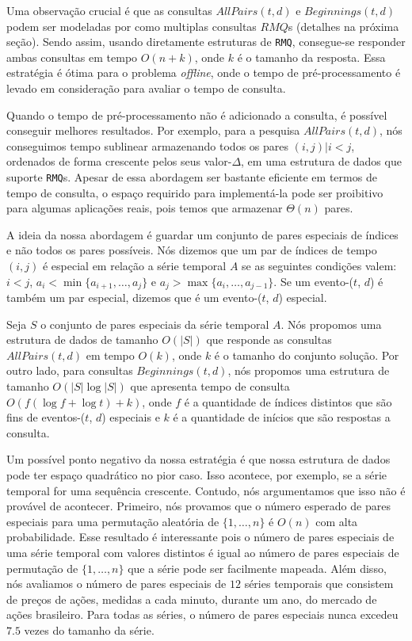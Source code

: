 \documentclass[12pt]{article}
\begin{document}
Uma observação crucial é que as consultas $AllPairs(t, d)$ e $Beginnings(t,d)$ podem
ser modeladas por como multiplas consultas $RMQ$s (detalhes na próxima seção). Sendo assim,
usando diretamente estruturas de \verb|RMQ|, consegue-se responder ambas consultas
em tempo $O(n + k)$, onde $k$ é o tamanho da resposta. Essa estratégia é ótima para
o problema \textit{offline}, onde o tempo de pré-processamento é levado em consideração
para avaliar o tempo de consulta.

Quando o tempo de pré-processamento não é adicionado a consulta, é possível conseguir
melhores resultados. Por exemplo, para a pesquisa $AllPairs(t,d)$, nós conseguimos
tempo sublinear armazenando todos os pares ${(i,j)| i < j}$, ordenados de forma crescente
pelos seus valor-$\Delta$, em uma estrutura de dados que suporte \verb|RMQ|s. Apesar 
de essa abordagem ser bastante eficiente em termos de tempo de consulta, o espaço
requirido para implementá-la pode ser proibitivo para algumas aplicações reais, pois
temos que armazenar $\Theta(n)$ pares.

A ideia da nossa abordagem é guardar um conjunto de pares especiais de índices
e não todos os pares possíveis. Nós dizemos que um par de índices de tempo $(i,j)$ é
especial em relação a série temporal $A$ se as seguintes condições valem:
$i < j$, $a_i < \min\{a_{i+1}, \ldots, a_j\}$ e $a_j > \max\{a_i, \ldots, a_{j-1}\}$. 
Se um evento-($t$, $d$) é também um par especial, dizemos que é um evento-($t$, $d$) especial.

Seja $S$ o conjunto de pares especiais da série temporal $A$. Nós propomos uma estrutura
de dados de tamanho $O(|S|)$ que responde as consultas $AllPairs(t,d)$ em tempo $O(k)$,
onde $k$ é o tamanho do conjunto solução. Por outro lado, para consultas $Beginnings(t,d)$,
nós propomos uma estrutura de tamanho $O(|S|\log|S|)$ que apresenta tempo de consulta $O(f(\log f + \log t) + k)$,
onde $f$ é a quantidade de índices distintos que são fins de eventos-($t$, $d$) especiais e $k$ 
é a quantidade de inícios que são respostas a consulta.

Um possível ponto negativo da nossa estratégia é que nossa estrutura de dados pode
ter espaço quadrático no pior caso. Isso acontece, por exemplo, se a série temporal
for uma sequência crescente. Contudo, nós argumentamos que isso não é provável de acontecer.
Primeiro, nós provamos que o número esperado de pares especiais para uma permutação aleatória
de $\{1, \ldots, n\}$ é $O(n)$ com alta probabilidade. Esse resultado é interessante pois o número
de pares especiais de uma série temporal com valores distintos é igual ao número de pares 
especiais de permutação de $\{1, \ldots, n\}$ que a série pode ser facilmente mapeada. Além disso,
nós avaliamos o número de pares especiais de $12$ séries temporais que consistem de preços de ações,
medidas a cada minuto, durante um ano, do mercado de ações brasileiro. Para todas as séries, 
o número de pares especiais nunca excedeu $7.5$ vezes do tamanho da série. 
\end{document}
